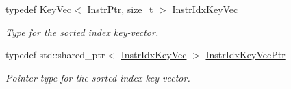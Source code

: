 \begin{DoxyCompactItemize}
\mbox{\label{classilang_1_1_instr_seq_a88aec9fe794aec924d30c0fc2cb0fdd4}} 
typedef \mbox{\hyperlink{classilang_1_1_key_vec}{Key\+Vec}}$<$ \mbox{\hyperlink{namespaceilang_af88a19312ae653d687a0d1207bb284f6}{Instr\+Ptr}}, size\+\_\+t $>$ \mbox{\hyperlink{classilang_1_1_instr_seq_a88aec9fe794aec924d30c0fc2cb0fdd4}{Instr\+Idx\+Key\+Vec}}
\begin{DoxyCompactList}\small\item\em Type for the sorted index key-\/vector. \end{DoxyCompactList}\item 
\mbox{\label{classilang_1_1_instr_seq_a3d0e6e7c233f7def6b7023e9be05f034}} 
typedef std\+::shared\+\_\+ptr$<$ \mbox{\hyperlink{classilang_1_1_instr_seq_a88aec9fe794aec924d30c0fc2cb0fdd4}{Instr\+Idx\+Key\+Vec}} $>$ \mbox{\hyperlink{classilang_1_1_instr_seq_a3d0e6e7c233f7def6b7023e9be05f034}{Instr\+Idx\+Key\+Vec\+Ptr}}
\begin{DoxyCompactList}\small\item\em Pointer type for the sorted index key-\/vector. \end{DoxyCompactList}\end{DoxyCompactItemize}
